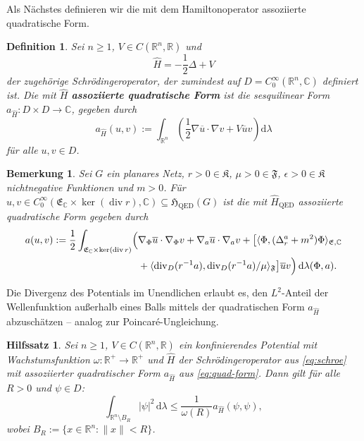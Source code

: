 \documentclass[11pt,a4paper,leqno]{report}
\newtheorem{lemma}[theorem]{Hilfssatz}
\newtheorem{definition}[theorem]{Definition}
\newtheorem{remark}[theorem]{Bemerkung}
\numberwithin{equation}{chapter}
\begin{document}
\noindent
Als Nächstes definieren wir die mit dem Hamiltonoperator assoziierte quadratische Form.
\begin{definition}\label{def:quad}
	Sei $n \ge 1$, $V \in C(\mathbb{R}^n, \mathbb{R})$ und 
	\[
	\hat{H} = -\frac{1}{2}\Delta + V \label{eq:schroe}
	\]
	der zugehörige Schrödingeroperator, der zumindest auf $D = C^\infty_0(\mathbb{R}^n, \mathbb{C})$ definiert ist. 
	Die mit $\hat{H}$  \textbf{assoziierte quadratische Form} ist die sesquilinear Form $a_{\hat{H}}: D \times D \to \mathbb{C}$, gegeben durch
	\begin{equation}
		a_{\hat{H}}(u, v) := \int_{\mathbb{R}^n} \left( \frac{1}{2} \nabla \overline{u} \cdot \nabla v + V \overline{u} v \right) \mathrm{d}\lambda
		\label{eq:quad-form}
	\end{equation}
	für alle $u,v \in D$.
\end{definition}
\begin{remark}
	Sei $G$ ein planares Netz, $r>0\in\mathfrak{K}$, $\mu>0\in\mathfrak{F}$, $\epsilon>0\in\mathfrak{K}$ nichtnegative Funktionen und $m>0$. Für $u,v\in C^\infty_0(\mathfrak{E}_\mathbb{C}\times\ker(\operatorname{div} r),\mathbb{C})\subseteq \mathfrak{H}_\text{QED}(G)$ ist die mit $\hat{H}_\text{QED}$ assoziierte quadratische Form gegeben durch
	\begin{align}
		a(u,v) := \frac{1}{2} \int_{\mathfrak{E}_\mathbb{C}\times\ker(\operatorname{div} r)} \Bigl(& \nabla_\Phi \overline{u} \cdot \nabla_\Phi v + \nabla_a \overline{u} \cdot \nabla_a v \notag 
		+ \bigl[ \langle \Phi, (\Delta_r^a + m^2)\Phi \rangle_{\mathfrak{E},\mathbb{C}} \\ &+ \langle \operatorname{div}_D(r^{-1}a), \operatorname{div}_D(r^{-1}a)/\mu \rangle_{\mathfrak{F}} \bigr] \overline{u} v \Bigr) \, \mathrm{d}\lambda(\Phi,a).
	\end{align}
\end{remark}
\noindent
Die Divergenz des Potentials im Unendlichen erlaubt es, den $L^2$-Anteil der Wellenfunktion außerhalb eines Balls mittels der quadratischen Form $a_{\hat{H}}$ abzuschätzen -- analog zur Poincaré-Ungleichung.
\begin{lemma}\label{lem:poincare-konf}
	Sei $n \ge 1$, $V \in C(\mathbb{R}^n, \mathbb{R})$ ein konfinierendes Potential mit Wachstumsfunktion $\omega: \mathbb{R}^+ \to \mathbb{R}^+$ und $\hat{H}$ der Schrödingeroperator aus \eqref{eq:schroe} mit assoziierter quadratischer Form $a_{\hat{H}}$ aus \eqref{eq:quad-form}. 
	Dann gilt für alle $R > 0$ und $\psi \in D$:
	\begin{equation}\label{eq:poincare-konf}
		\int_{\mathbb{R}^n \setminus B_R} |\psi|^2 \, \mathrm{d}\lambda \le \frac{1}{\omega(R)} a_{\hat{H}}(\psi, \psi),
	\end{equation}
	wobei $B_R := \{ x \in \mathbb{R}^n : \|x\| < R \}$.
\end{lemma}
\end{document}
